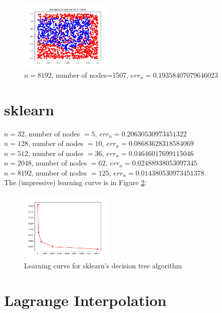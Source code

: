 \documentclass[a4paper]{article}
\theoremstyle{definition}
\begin{document}
\begin{enumerate}
\begin{figure}[h!]
\centering
\includegraphics[width=0.4\textwidth]{data/n8192.png}
\caption{$ n=8192 $, number of nodes=1507, $ err_n=0.19358407079646023 $}
\label{fig:fig7}
\end{figure}	
	
	\end{enumerate}

\section{sklearn}


$ n=32 $, number of nodes $ =5 $, $ err_n=0.20630530973451322 $\\
$ n=128 $, number of nodes $ =10 $, $ err_n=0.08683628318584069 $\\
$ n=512 $, number of nodes $ =36 $, $ err_n=0.04646017699115046 $\\
$ n=2048 $, number of nodes $ =62 $, $ err_n=0.02488938053097345 $\\
$ n=8192 $, number of nodes $ =125 $, $ err_n=0.014380530973451378 $\\
The (impressive) learning curve is in Figure \ref{fig:fig9}:

\begin{figure}[h!]
	\centering
	\includegraphics[width=0.4\textwidth]{data/goodroc.png}
	\caption{Learning curve for sklearn's decision tree algorithm}
	\label{fig:fig9}
\end{figure}	

\section{Lagrange Interpolation}
\end{document}

